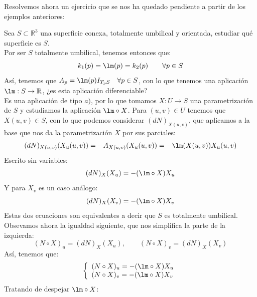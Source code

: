 \noindent
Resolvemos ahora un ejercicio que se nos ha quedado pendiente a partir de los ejemplos anteriores:
\begin{ejercicio}
    Sea $S\subset\mathbb{R}^3$ una superficie conexa, totalmente umbilical y orientada, estudiar qué superficie es $S$.\\

    \noindent
    Por ser $S$ totalmente umbilical, tenemos entonces que:
    \begin{equation*}
        k_1(p) = \lm(p) = k_2(p) \qquad \forall p\in S
    \end{equation*}
    Así, tenemos que $A_p = \lm(p) I_{T_pS}\quad \forall p\in S$, con lo que tenemos una aplicación $\lm:S\to \mathbb{R}$, ¿es esta aplicación diferenciable?\\

    \noindent
    Es una aplicación de tipo $a)$, por lo que tomamos $X:U\to S$ una parametrización de $S$ y estudiamos la aplicación $\lm\circ X$. Para $(u,v)\in U$ tenemos que $X(u,v)\in S$, con lo que podemos considerar $(dN)_{X(u,v)}$, que aplicamos a la base que nos da la parametrización $X$ por sus parciales:
    \begin{equation*}
    (dN)_{X(u,v)}(X_u(u,v)) = -A_{X(u,v)}(X_u(u,v)) = -\lm(X(u,v))X_u(u,v)
    \end{equation*}
    Escrito sin variables:
    \begin{equation*}
        (dN)_X(X_u) = -(\lm \circ X)X_u
    \end{equation*}
    Y para $X_v$ es un caso análogo:
    \begin{equation*}
        (dN)_X(X_v) = -(\lm \circ X)X_v
    \end{equation*}
    Estas dos ecuaciones son equivalentes a decir que $S$ es totalmente umbilical. Obsevamos ahora la igualdad siguiente, que nos simplifica la parte de la izquierda:
    \begin{equation*}
        (N\circ X)_u = (dN)_X(X_u), \qquad (N\circ X)_v = (dN)_X(X_v)
    \end{equation*}
    Así, tenemos que:
    \begin{equation}\label{eq:ecs_ejm}
        \left\{\begin{array}{l}
                (N\circ X)_u = -(\lm \circ X)X_u \\
                (N\circ X)_v = -(\lm \circ X)X_v 
        \end{array}\right.
    \end{equation}
    Tratando de despejar $\lm \circ X$:

\end{ejercicio}
